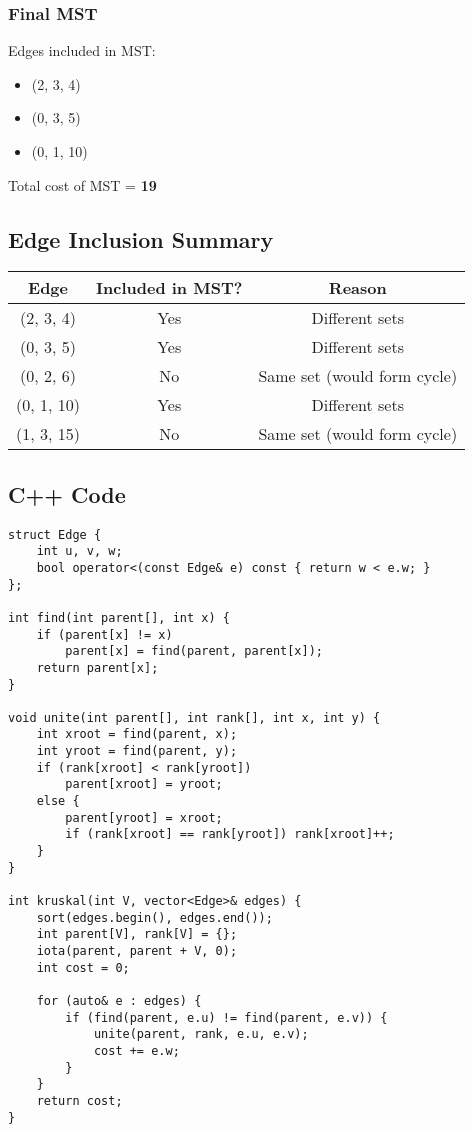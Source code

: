 \documentclass[14pt,a4paper]{extarticle}
\begin{document}
\subsubsection*{Final MST}
Edges included in MST:
\begin{itemize}
    \item (2, 3, 4)
    \item (0, 3, 5)
    \item (0, 1, 10)
\end{itemize}
Total cost of MST = \textbf{19}

\subsection*{Edge Inclusion Summary}
\begin{center}
\begin{tabular}{|c|c|c|}
\hline
\textbf{Edge} & \textbf{Included in MST?} & \textbf{Reason} \\
\hline
(2, 3, 4) & Yes & Different sets \\
(0, 3, 5) & Yes & Different sets \\
(0, 2, 6) & No & Same set (would form cycle) \\
(0, 1, 10) & Yes & Different sets \\
(1, 3, 15) & No & Same set (would form cycle) \\
\hline
\end{tabular}
\end{center}

\newpage
\subsection{C++ Code}
\begin{lstlisting}[style=cpp, caption={Kruskal's Algorithm in C++}]
struct Edge {
    int u, v, w;
    bool operator<(const Edge& e) const { return w < e.w; }
};

int find(int parent[], int x) {
    if (parent[x] != x)
        parent[x] = find(parent, parent[x]);
    return parent[x];
}

void unite(int parent[], int rank[], int x, int y) {
    int xroot = find(parent, x);
    int yroot = find(parent, y);
    if (rank[xroot] < rank[yroot])
        parent[xroot] = yroot;
    else {
        parent[yroot] = xroot;
        if (rank[xroot] == rank[yroot]) rank[xroot]++;
    }
}

int kruskal(int V, vector<Edge>& edges) {
    sort(edges.begin(), edges.end());
    int parent[V], rank[V] = {};
    iota(parent, parent + V, 0);
    int cost = 0;

    for (auto& e : edges) {
        if (find(parent, e.u) != find(parent, e.v)) {
            unite(parent, rank, e.u, e.v);
            cost += e.w;
        }
    }
    return cost;
}
\end{lstlisting}
\end{document}
